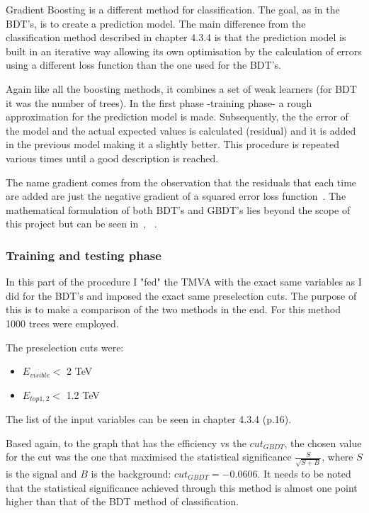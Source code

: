 \documentclass[12pt,a4paper]{report}
\begin{document}
Gradient Boosting is a different method for classification. The goal, as in the BDT's, is to create a 
prediction model. The main difference from the classification method described in chapter 4.3.4 is that 
the prediction model is built in an iterative way allowing its own optimisation by the calculation of errors
using a different loss function than the one used for the BDT's.

Again like all the boosting methods, it combines a set of weak learners (for BDT it was the number of trees).
In the first phase -training phase- a rough approximation for the prediction model is made. Subsequently, the 
the error of the model and the actual expected values is calculated (residual) and it is added in the
previous model making it a slightly  better. This procedure is repeated various times until a good description
is reached. 

The name gradient comes from the observation that the residuals that each time are added are just the 
negative gradient of a squared error loss function~\cite{hoecker2007tmva}. The mathematical formulation of 
both BDT's and GBDT's lies beyond the scope of this project but can be seen in~\cite{schapire1999brief},
~\cite{hoecker2007tmva}.


\subsubsection{Training and testing phase}

In this part of the procedure I "fed" the TMVA with the exact same variables as I did for the BDT's and 
imposed the exact same preselection cuts. The purpose of this is to make a comparison of the two methods in 
the end. For this method 1000 trees were employed.

The preselection cuts were:

\begin{itemize}
 \item $E_{visible} <$ 2 TeV
 \item $E_{top1,2} <$ 1.2 TeV
\end{itemize}

The list of the input variables can be seen in chapter 4.3.4 (p.16).

Based again, to the graph that has the efficiency vs the $cut_{GBDT}$, the chosen value for the cut was the one
that maximised the statistical significance $\frac{S}{\sqrt{S+B}}$, where $S$ is the signal and $B$ is the 
background: $cut_{GBDT}=-0.0606$. It needs to be noted that the statistical significance achieved through
this method is almost one point higher than that of the BDT method of classification.
\end{document}
